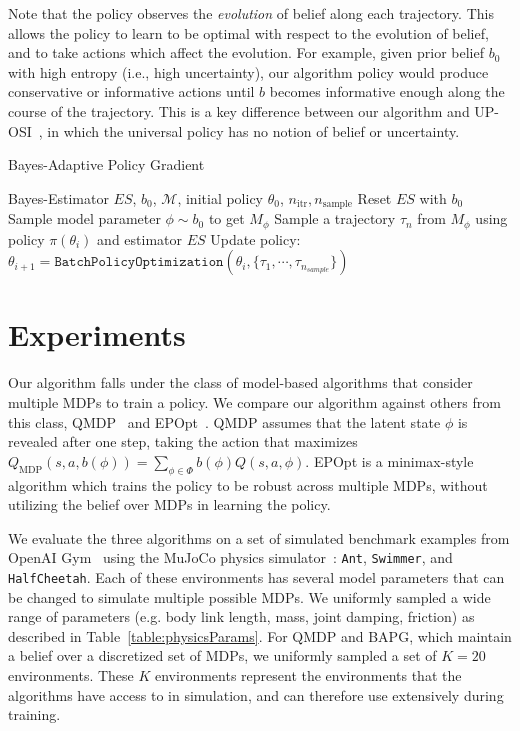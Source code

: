 \documentclass{article}
\newcommand{\tabref}[1]{Table~\ref{#1}}%
\DeclareMathOperator*{\argmin}{arg\,min}
\begin{document}
Note that the policy observes the \emph{evolution} of belief along each trajectory. This allows the policy to learn to be optimal with respect to the evolution of belief, and to take actions which affect the evolution. For example, given prior belief $b_0$ with high entropy (i.e., high uncertainty), our algorithm policy would produce conservative or informative actions until $b$ becomes informative enough along the course of the trajectory. This is a key difference between our algorithm and UP-OSI~\cite{yu2017uposi}, in which the universal policy has no notion of belief or uncertainty.

%
%
\begin{algorithm}[tb]
\caption{Bayes-Adaptive Policy Gradient}
\label{algo:bapg}
\begin{algorithmic}[1]
\Require Bayes-Estimator $ES$, $b_0$, $\mathcal{M}$, initial policy $\theta_0$, $n_\text{itr}, n_\text{sample}$
\vspace{2mm}
    \State Reset $ES$ with $b_0$
    \State Sample model parameter $\phi \sim b_0$ to get $M_{\phi}$
    \State Sample a trajectory $\tau_n$ from $M_{\phi}$ using policy $\pi(\theta_i)$ and estimator $ES$
  \EndFor
  \State Update policy: $\theta_{i+1} = \texttt{BatchPolicyOptimization}(\theta_i, \{\tau_1, \cdots, \tau_{n_{sample}}\})$
\EndFor
\end{algorithmic}
\end{algorithm}

\section{Experiments}

Our algorithm falls under the class of model-based algorithms that consider multiple MDPs to train a policy.
We compare our algorithm against others from this class, QMDP~\cite{littman1995learning, karkus2017qmdp} and EPOpt~\cite{rajeswaran2016epopt}.
QMDP assumes that the latent state $\phi$ is revealed after one step, taking the action that maximizes $Q_{\text{MDP}}(s, a, b(\phi)) = \sum_{\phi \in \Phi} b(\phi) Q(s, a, \phi)$.
EPOpt is a minimax-style algorithm which trains the policy to be robust across multiple MDPs, without utilizing the belief over MDPs in learning the policy.

We evaluate the three algorithms on a set of simulated benchmark examples from OpenAI Gym~\cite{openai-gym} using the MuJoCo physics simulator~\cite{todorov2012mujoco}: \texttt{Ant}, \texttt{Swimmer}, and \texttt{HalfCheetah}.
Each of these environments has several model parameters that can be changed to simulate multiple possible MDPs.
We uniformly sampled a wide range of parameters (e.g. body link length, mass, joint damping, friction) as described in \tabref{table:physicsParams}.
For QMDP and BAPG, which maintain a belief over a discretized set of MDPs, we uniformly sampled a set of $K = 20$ environments.
These $K$ environments represent the environments that the algorithms have access to in simulation, and can therefore use extensively during training.
\end{document}
